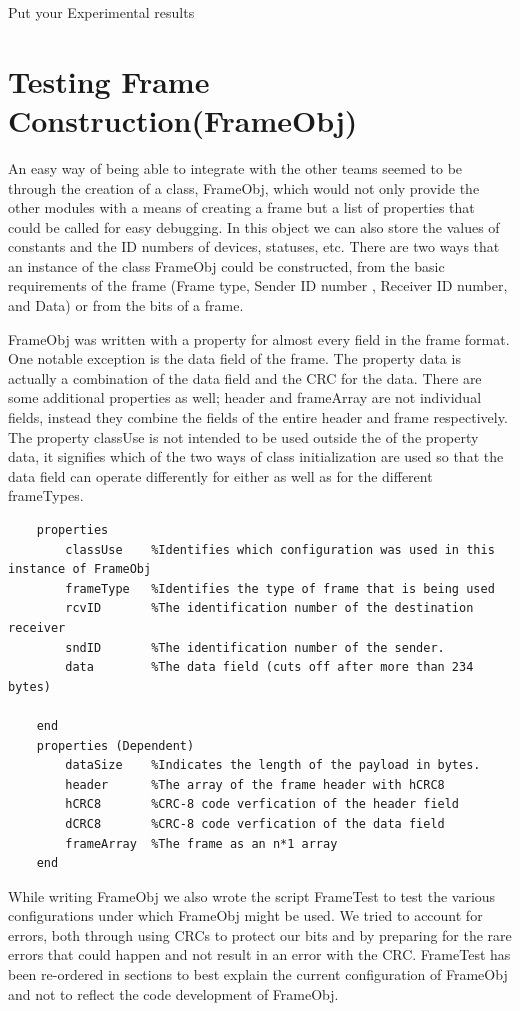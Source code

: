 
Put your Experimental results
\section{Testing Frame Construction(FrameObj)}
An easy way of being able to integrate with the other teams seemed to be through the creation of a class, FrameObj, which would not only provide the other modules with a means of creating a frame but a list of properties that could be called for easy debugging. In this object we can also store the values of constants and the ID numbers of devices, statuses, etc.  There are two ways that an instance of the class FrameObj could be constructed,  from the basic requirements of the frame (Frame type, Sender ID number , Receiver ID number, and Data) or from the bits of a frame.

FrameObj was written with a property for almost every field in the frame format. One notable exception is the data field of the frame. The property data is actually a combination of the data field and the CRC for the data. There are some additional properties as well; header and frameArray are not individual fields, instead they combine the fields of the entire header and frame respectively. The property classUse is not intended to be used outside the of the property data, it signifies which of the two ways of class initialization are used so that the data field can operate differently for either as well as for the different frameTypes.
 
\begin{lstlisting} 
    properties
        classUse    %Identifies which configuration was used in this instance of FrameObj
        frameType   %Identifies the type of frame that is being used
        rcvID       %The identification number of the destination receiver
        sndID       %The identification number of the sender.
        data        %The data field (cuts off after more than 234 bytes)
        
    end
    properties (Dependent)
        dataSize    %Indicates the length of the payload in bytes.
        header      %The array of the frame header with hCRC8
        hCRC8       %CRC-8 code verfication of the header field
        dCRC8       %CRC-8 code verfication of the data field
        frameArray  %The frame as an n*1 array
    end
\end{lstlisting}

While writing FrameObj we also wrote the script FrameTest to test the various configurations under which FrameObj might be used. We tried to account for errors, both through using CRCs to protect our bits and by preparing for the rare errors that could happen and not result in an error with the CRC. FrameTest has been re-ordered in sections to best explain the current configuration of FrameObj and not to reflect the code development of FrameObj.

